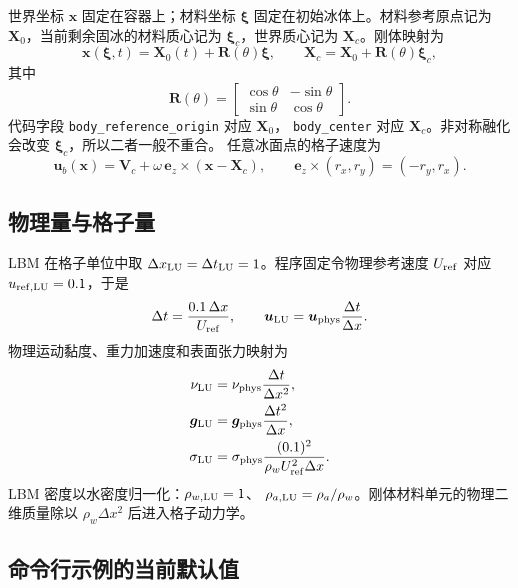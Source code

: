 \documentclass[UTF8,zihao=-4]{ctexart}
\newcommand{\vect}[1]{\boldsymbol{#1}}
\newcommand{\code}[1]{\texttt{#1}}
\numberwithin{equation}{section}
\begin{document}
世界坐标 $\vect x$ 固定在容器上；材料坐标 $\vect\xi$ 固定在初始冰体上。材料参考原点记为
$\vect X_0$，当前剩余固冰的材料质心记为 $\vect\xi_c$，世界质心记为 $\vect X_c$。刚体映射为
\begin{equation}
  \vect x(\vect\xi,t)=\vect X_0(t)+\vect R(\theta)\vect\xi,
  \qquad
  \vect X_c=\vect X_0+\vect R(\theta)\vect\xi_c,
  \label{eq:rigid-map}
\end{equation}
其中
\begin{equation}
  \vect R(\theta)=
  \begin{bmatrix}\cos\theta&-\sin\theta\\ \sin\theta&\cos\theta\end{bmatrix}.
\end{equation}
代码字段 \code{body\_reference\_origin} 对应 $\vect X_0$，
\code{body\_center} 对应 $\vect X_c$。非对称融化会改变 $\vect\xi_c$，所以二者一般不重合。
任意冰面点的格子速度为
\begin{equation}
  \vect u_b(\vect x)=\vect V_c+\omega\,\vect e_z\times(\vect x-\vect X_c),
  \qquad
  \vect e_z\times(r_x,r_y)=(-r_y,r_x).
  \label{eq:body-point-velocity}
\end{equation}

\subsection{物理量与格子量}

LBM 在格子单位中取 $\Delta x_{\rm LU}=\Delta t_{\rm LU}=1$。程序固定令物理参考速度
$U_{\rm ref}$ 对应 $u_{\rm ref,LU}=0.1$，于是
\begin{equation}
  \Delta t=\frac{0.1\,\Delta x}{U_{\rm ref}},
  \qquad
  \vect u_{\rm LU}=\vect u_{\rm phys}\frac{\Delta t}{\Delta x}.
  \label{eq:lattice-time-map}
\end{equation}
物理运动黏度、重力加速度和表面张力映射为
\begin{align}
  \nu_{\rm LU}&=\nu_{\rm phys}\frac{\Delta t}{\Delta x^2},\\
  \vect g_{\rm LU}&=\vect g_{\rm phys}\frac{\Delta t^2}{\Delta x},\\
  \sigma_{\rm LU}&=\sigma_{\rm phys}
    \frac{(0.1)^2}{\rho_wU_{\rm ref}^2\Delta x}.
  \label{eq:physical-lattice-scales}
\end{align}
LBM 密度以水密度归一化：$\rho_{w,\rm LU}=1$、
$\rho_{a,\rm LU}=\rho_a/\rho_w$。刚体材料单元的物理二维质量除以
$\rho_w\Delta x^2$ 后进入格子动力学。

\subsection{命令行示例的当前默认值}
\end{document}
